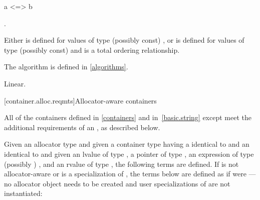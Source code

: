 \begin{itemdecl}
a <=> b
\end{itemdecl}

\begin{itemdescr}
\pnum
\result
{}.

\pnum
\expects
Either \tcode{<=>} is defined for values of type (possibly const) ,
or \tcode{<} is defined for values of type (possibly const)  and
\tcode{<} is a total ordering relationship.

\pnum
\returns
{}
\begin{note}
The algorithm 
is defined in \ref{algorithms}.
\end{note}

\pnum
\complexity
Linear.
\end{itemdescr}

[container.alloc.reqmts]{Allocator-aware containers}

\pnum
All of the containers defined in \ref{containers} and in~\ref{basic.string} except 
meet the additional requirements of an ,
as described below.

\pnum
Given an allocator type 
and given a container type  having a  identical to 
and an  identical to 
and given an lvalue  of type ,
a pointer  of type ,
an expression  of type (possibly ) ,
and an rvalue  of type ,
the following terms are defined. If 
is not allocator-aware or is a specialization of ,
the terms below are defined as if  were
 --- no allocator object needs to be created
and user specializations of  are not instantiated:

